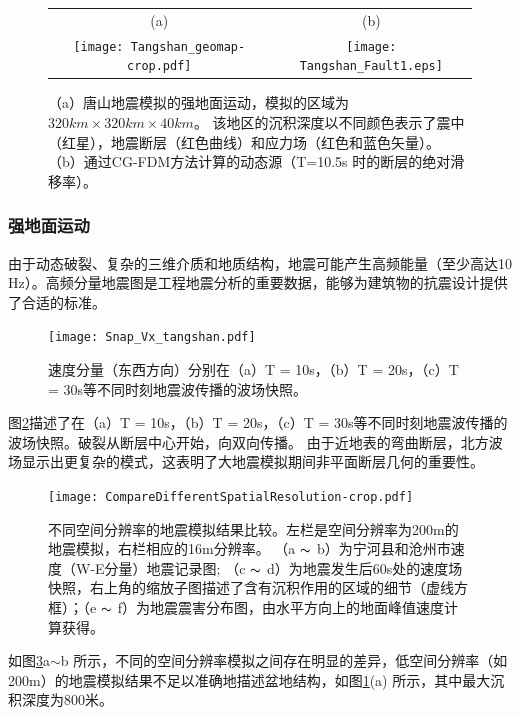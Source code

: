 \begin{figure}[t]
\begin{tabular}{cc}
(a) & (b) \\
    \texttt{[image: Tangshan\_geomap-crop.pdf]} &
    \texttt{[image: Tangshan\_Fault1.eps]}
\end{tabular}
    \caption{
（a）唐山地震模拟的强地面运动，模拟的区域为$320km \times 320km \times 40km$。 该地区的沉积深度以不同颜色表示了震中（红星），地震断层（红色曲线）和应力场（红色和蓝色矢量）。 （b）通过CG-FDM方法计算的动态源（T=10.5s 时的断层的绝对滑移率）。}
    \label{fig:tangshan_geomap}
\end{figure}


\subsubsection{强地面运动}

由于动态破裂、复杂的三维介质和地质结构，地震可能产生高频能量（至少高达10 Hz）。高频分量地震图是工程地震分析的重要数据，能够为建筑物的抗震设计提供了合适的标准。

\begin{figure}[ht]
    \texttt{[image: Snap\_Vx\_tangshan.pdf]}\\
    \caption{速度分量（东西方向）分别在（a）T = 10s，（b）T = 20s，（c）T = 30s等不同时刻地震波传播的波场快照。}
    \label{fig:strong_motion_2}
\end{figure}

图\ref{fig:strong_motion_2}描述了在（a）T = 10s，（b）T = 20s，（c）T = 30s等不同时刻地震波传播的波场快照。破裂从断层中心开始，向双向传播。 由于近地表的弯曲断层，北方波场显示出更复杂的模式，这表明了大地震模拟期间非平面断层几何的重要性。

\begin{figure}[t]
  \centering
  \texttt{[image: CompareDifferentSpatialResolution-crop.pdf]}
  \caption{
不同空间分辨率的地震模拟结果比较。左栏是空间分辨率为200m的地震模拟，右栏相应的16m分辨率。 （a $ \thicksim $ b）为宁河县和沧州市速度（W-E分量）地震记录图; （c $ \thicksim $ d）为地震发生后60s处的速度场快照，右上角的缩放子图描述了含有沉积作用的区域的细节（虚线方框）；（e $ \thicksim $ f）为地震震害分布图，由水平方向上的地面峰值速度计算获得。}
  \label{fig:strong_motion}
\end{figure}

如图\ref{fig:strong_motion}a$\sim$b 所示，不同的空间分辨率模拟之间存在明显的差异，低空间分辨率（如200m）的地震模拟结果不足以准确地描述盆地结构，如图\ref{fig:tangshan_geomap}(a) 所示，其中最大沉积深度为800米。

